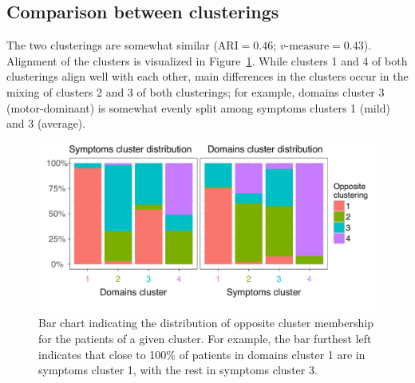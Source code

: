 \documentclass[preprint,5p]{elsarticle} %
\begin{document}
\subsection{Comparison between clusterings}

The two clusterings are somewhat similar ($\text{ARI} = 0.46$; $\text{$v$-measure} = 0.43$).
Alignment of the clusters is visualized in Figure~\ref{fig:align}. While clusters 1 and 4 of both
clusterings align well with each other, main differences in the clusters occur in the mixing of
clusters 2 and 3 of both clusterings; for example, domains cluster 3 (motor-dominant) is somewhat
evenly split among symptoms clusters 1 (mild) and 3 (average).

\begin{figure}[H]
  \centering
  \includegraphics[width=\linewidth]{cluster-alignment.pdf}
  \caption{Bar chart indicating the distribution of opposite cluster membership for the patients of
  a given cluster. For example, the bar furthest left indicates that close to 100\% of patients in
domains cluster 1 are in symptoms cluster 1, with the rest in symptoms cluster 3.}
  \label{fig:align}
\end{figure}
\end{document}
